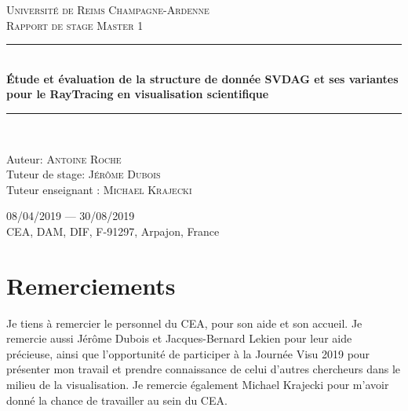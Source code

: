 \documentclass[12pt,a4paper,twoside]{article}
\newcommand{\HRule}{\rule{\linewidth}{0.5mm}}
\begin{document}
\begin{titlepage}
\begin{sffamily}
\begin{center}
\begin{figure}[h]
\begin{minipage}[c]{.46\linewidth}
                    \end{minipage}
                \end{figure}
                \vspace{2cm}
                \textsc{\LARGE Université de Reims Champagne-Ardenne}\\[2cm]
                \textsc{\Large Rapport de stage Master 1}\\[1.5cm]
                \HRule \\[1cm]
                { \Large \bfseries Étude et évaluation de la structure de donnée SVDAG et ses variantes pour le RayTracing en visualisation scientifique \\[0.4cm] }
                \HRule \\[2cm]


                \begin{minipage}{0.8\textwidth}
                    \begin{flushleft}
                        \Large Auteur: \textsc{Antoine Roche}\\
                        Tuteur de stage: \textsc{Jérôme Dubois}\\
                        Tuteur enseignant : \textsc{Michael Krajecki}\\
                    \end{flushleft}
                \end{minipage}

                \vfill
                \Large 08/04/2019 — 30/08/2019 \\[1cm]
                \Huge {CEA, DAM, DIF, F-91297, Arpajon, France}

            \end{center}
        \end{sffamily}
    \end{titlepage}

    \newpage
    \section*{Remerciements}

    Je tiens à remercier le personnel du CEA, pour son aide et son accueil.
    Je remercie aussi Jérôme Dubois et Jacques-Bernard Lekien pour leur aide précieuse, ainsi que l'opportunité de participer
    à la Journée Visu 2019 pour présenter mon travail et prendre connaissance de celui d'autres chercheurs dans le milieu de la visualisation.
    Je remercie également Michael Krajecki pour m'avoir donné la chance de travailler au sein du CEA.
\end{document}
